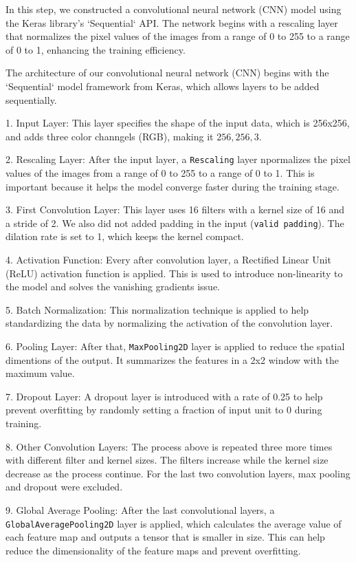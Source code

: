 In this step, we constructed a convolutional neural network (CNN) model using the Keras library's `Sequential` API. The network begins with a rescaling layer that normalizes the pixel values of the images from a range of 0 to 255 to a range of 0 to 1, enhancing the training efficiency. 

The architecture of our convolutional neural network (CNN) begins with the `Sequential` model framework from Keras, which allows layers to be added sequentially. 

1. Input Layer: This layer specifies the shape of the input data, which is 256x256, and adds three color channgels (RGB), making it \(256, 256, 3\).

2. Rescaling Layer: After the input layer, a \texttt{Rescaling} layer npormalizes the pixel values of the images from a range of 0 to 255 to a range of 0 to 1. This is important because it helps the model converge faster during the training stage.

3. First Convolution Layer: This layer uses 16 filters with a kernel size of 16 and a stride of 2. We also did not added padding in the input (\texttt{valid padding}). The dilation rate is set to 1, which keeps the kernel compact.

4. Activation Function: Every after convolution layer, a Rectified Linear Unit (ReLU) activation function is applied. This is used to introduce non-linearity to the model and solves the vanishing gradients issue.

5. Batch Normalization: This normalization technique is applied to help standardizing the data by normalizing the activation of the convolution layer.

6. Pooling Layer: After that, \texttt{MaxPooling2D} layer is applied to reduce the spatial dimentions of the output. It summarizes the features in a 2x2 window with the maximum value.

7. Dropout Layer: A dropout layer is introduced with a rate of 0.25 to help prevent overfitting by randomly setting a fraction of input unit to 0 during training.

8. Other Convolution Layers: The process above is repeated three more times with different filter and kernel sizes. The filters increase while the kernel size decrease as the process continue. For the last two convolution layers, max pooling and dropout were excluded.

9. Global Average Pooling: After the last convolutional layers, a \texttt{GlobalAveragePooling2D} layer is applied, which calculates the average value of each feature map and outputs a tensor that is smaller in size. This can help reduce the dimensionality of the feature maps and prevent overfitting. 

